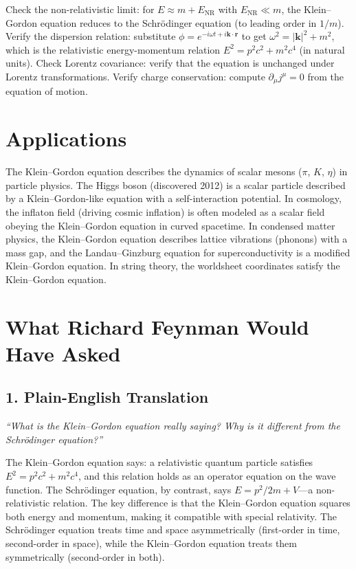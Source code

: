 \documentclass[11pt,openright]{book}
\begin{document}
Check the non-relativistic limit: for $E \approx m + E_{\text{NR}}$ with $E_{\text{NR}} \ll m$, the Klein--Gordon equation reduces to the Schr\"odinger equation (to leading order in $1/m$). Verify the dispersion relation: substitute $\phi = e^{-i\omega t + i\mathbf{k}\cdot\mathbf{r}}$ to get $\omega^2 = |\mathbf{k}|^2 + m^2$, which is the relativistic energy-momentum relation $E^2 = p^2c^2 + m^2c^4$ (in natural units). Check Lorentz covariance: verify that the equation is unchanged under Lorentz transformations. Verify charge conservation: compute $\partial_\mu j^\mu = 0$ from the equation of motion.
\section*{Applications}

The Klein--Gordon equation describes the dynamics of scalar mesons ($\pi$, $K$, $\eta$) in particle physics. The Higgs boson (discovered 2012) is a scalar particle described by a Klein--Gordon-like equation with a self-interaction potential. In cosmology, the inflaton field (driving cosmic inflation) is often modeled as a scalar field obeying the Klein--Gordon equation in curved spacetime. In condensed matter physics, the Klein--Gordon equation describes lattice vibrations (phonons) with a mass gap, and the Landau--Ginzburg equation for superconductivity is a modified Klein--Gordon equation. In string theory, the worldsheet coordinates satisfy the Klein--Gordon equation.
\section*{What Richard Feynman Would Have Asked}

\subsection*{1. Plain-English Translation}
\textit{``What is the Klein--Gordon equation really saying? Why is it different from the Schr\"odinger equation?''}

The Klein--Gordon equation says: a relativistic quantum particle satisfies $E^2 = p^2c^2 + m^2c^4$, and this relation holds as an operator equation on the wave function. The Schr\"odinger equation, by contrast, says $E = p^2/2m + V$---a non-relativistic relation. The key difference is that the Klein--Gordon equation squares both energy and momentum, making it compatible with special relativity. The Schr\"odinger equation treats time and space asymmetrically (first-order in time, second-order in space), while the Klein--Gordon equation treats them symmetrically (second-order in both).
\end{document}
